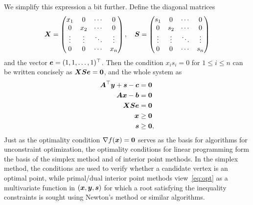 We simplify this expression a bit further. Define the diagonal matrices
\begin{equation*}
  \bm{X} = \begin{pmatrix}
   x_1 & 0 & \cdots & 0\\
   0 & x_2 & \cdots & 0\\
   \vdots & \vdots & \ddots & \vdots \\
   0 & 0 & \cdots & x_n
  \end{pmatrix},
  \quad
  \bm{S} = \begin{pmatrix}
   s_1 & 0 & \cdots & 0\\
   0 & s_2 & \cdots & 0\\
   \vdots & \vdots & \ddots & \vdots \\
   0 & 0 & \cdots & s_n
  \end{pmatrix}
\end{equation*}
and the vector $\bm{e}=(1,1,\dots,1)^{\top}$.
Then the condition $x_is_i=0$ for $1\leq i\leq n$ can be written concisely as $\bm{X}\bm{S}\bm{e}=\bm{0}$, and the whole system as
\begin{align}\label{eq:opt}
 \begin{split}
  \bm{A}^{\top}\bm{y}+\bm{s}-\bm{c} &= \bm{0}\\
  \bm{A}\bm{x}-\bm{b} & = \bm{0}\\
  \bm{X}\bm{S}\bm{e} &= \bm{0}\\
  \bm{x}&\geq \bm{0}\\
  \bm{s}&\geq \bm{0},
 \end{split}
\end{align}
Just as the optimality condition $\nabla f(\bm{x})=\bm{0}$ serves as the basis for algorithms for unconstraint optimization, the optimality conditions for linear programming form the basis of the simplex method and of interior point methods. In the simplex method, the conditions are used to verify whether a candidate vertex is an optimal point, while primal/dual interior point methods view~\eqref{eq:opt} as a multivariate function in $(\bm{x},\bm{y},\bm{s})$ for which a root satisfying the inequality constraints is sought using Newton's method or similar algorithms.

